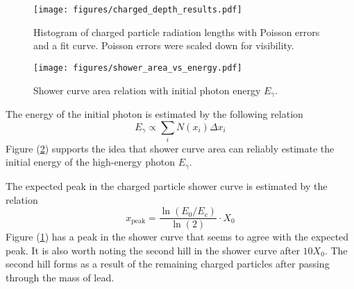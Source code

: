 \documentclass{article}
\begin{document}
\iffalse
The curve used to fit the histogram counts had the functional form
\begin{equation}
    N(x) = A x^b \exp \left(-\frac{x}{c}\right)
\end{equation}
\fi

\begin{figure}[htpb]
    \begin{center}
        \texttt{[image: figures/charged\_depth\_results.pdf]}
    \end{center}
    \caption{Histogram of charged particle radiation lengths with Poisson errors and a fit curve. Poisson errors were scaled down for visibility.}\label{fig:results}
\end{figure}

\iffalse
\begin{figure}
    \begin{center}
        \texttt{[image: figures/fit\_parameter\_convergence.pdf]}
    \end{center}
    \caption{Curve-fitting parameters plotted over varying number of bins}\label{fig:convergence}
\end{figure}
\fi

\begin{figure}
    \begin{center}
        \texttt{[image: figures/shower\_area\_vs\_energy.pdf]}
    \end{center}
    \caption{Shower curve area relation with initial photon energy \( E_\gamma \).}\label{fig:shower-area}
\end{figure}

The energy of the initial photon is estimated by the following relation
\begin{equation}
    E_\gamma \propto \sum_{i} N(x_i) \Delta x_i
\end{equation}
Figure (\ref{fig:shower-area}) supports the idea that shower curve area can reliably estimate the initial energy of the high-energy photon \( E_\gamma \).

The expected peak in the charged particle shower curve is estimated by the relation
\begin{equation}
    x_\text{peak} = \frac{\ln \left( E_{0} / E_c \right) }{\ln \left( 2 \right) } \cdot X_{0}
\end{equation}
Figure (\ref{fig:results}) has a peak in the shower curve that seems to agree with the expected peak. It is also worth noting the second hill in the shower curve after \( 10X_{0} \). The second hill forms as a result of the remaining charged particles after passing through the mass of lead.
\end{document}
